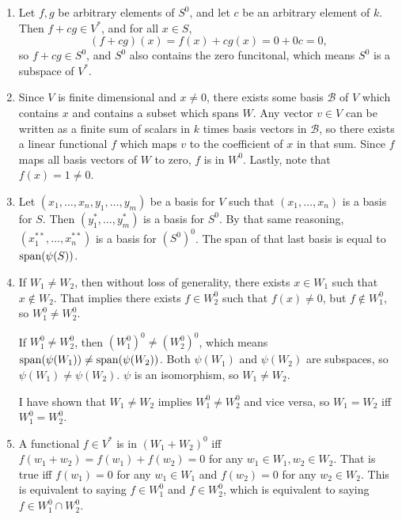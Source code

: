 \documentclass{article}
\begin{document}
\bigskip
\par
\begin{prob}
\end{prob}
\begin{enumerate}[label=(\alph*)]
    \item Let $f,g$ be arbitrary elements of $S^0$, and let $c$ be an arbitrary element of $k$. Then $f+cg \in V^*$, and for all $x \in S$,
        \[ (f+cg)(x) = f(x)+cg(x) = 0+0c=0, \]
        so $f+cg \in S^0$, and $S^0$ also contains the zero funcitonal, which means $S^0$ is a subspace of $V^*$.
    \item Since $V$ is finite dimensional and $x \neq 0$, there exists some basis $\mathcal{B}$ of $V$ which contains $x$ and contains a subset which spans $W$. Any vector $v \in V$ can be written as a finite sum of scalars in $k$ times basis vectors in $\mathcal{B}$, so there exists a linear functional $f$ which maps $v$ to the coefficient of $x$ in that sum. Since $f$ maps all basis vectors of $W$ to zero, $f$ is in $W^0$. Lastly, note that $f(x)=1\neq 0$.
    \item Let $(x_1, \dots, x_n, y_1, \dots, y_m)$ be a basis for $V$ such that $(x_1, \dots, x_n)$ is a basis for $S$. Then $(y_1^*, \dots, y_m^*)$ is a basis for $S^0$. By that same reasoning, $(x_1^{**}, \dots, x_n^{**})$ is a basis for $(S^0)^0$. The span of that last basis is equal to $\operatorname{span}(\psi(S))$.
    \item If $W_1 \neq W_2$, then without loss of generality, there exists $x \in W_1$ such that $x \not\in W_2$. That implies there exists $f \in W_2^0$ such that $f(x) \neq 0$, but $f \not\in W_1^0$, so $W_1^0 \neq W_2^0$.
        \par
        If $W_1^0 \neq W_2^0$, then $(W_1^0)^0 \neq (W_2^0)^0$, which means $\operatorname{span}(\psi(W_1)) \neq \operatorname{span}(\psi(W_2))$. Both $\psi(W_1)$ and $\psi(W_2)$ are subspaces, so $\psi(W_1)\neq \psi(W_2)$. $\psi$ is an isomorphism, so $W_1 \neq W_2$.
        \par
        I have shown that $W_1 \neq W_2$ implies $W_1^0 \neq W_2^0$ and vice versa, so $W_1 = W_2$ iff $W_1^0 = W_2^0$.
    \item A functional $f \in V^*$ is in $(W_1 + W_2)^0$ iff $f(w_1+w_2)=f(w_1)+f(w_2)=0$ for any $w_1 \in W_1, w_2 \in W_2$. That is true iff $f(w_1)=0$ for any $w_1 \in W_1$ and $f(w_2)=0$ for any $w_2 \in W_2$. This is equivalent to saying $f \in W_1^0$ and $f \in W_2^0$, which is equivalent to saying $f \in W_1^0 \cap W_2^0$.
\end{enumerate}
\end{document}
